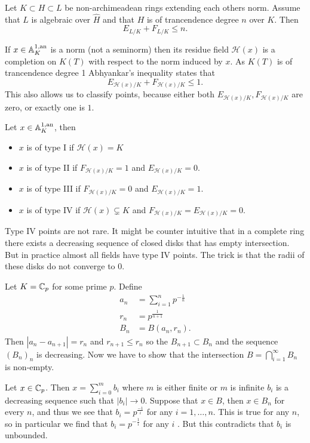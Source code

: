 \begin{theorem}
	Let $K \subset H \subset L$ be non-archimeadean rings extending each others norm. Assume that $L$ is algebraic over $\hat{H}$ and that $H$ is of trancendence degree $n$ over $K$. Then \[
	E_{L / K} + F_{L / K}  \le n
	.\] 
\end{theorem}

If $x \in \mathbb{A}_K^{1, \text{an}}$ is a norm (not a seminorm) then its residue field $\mathcal{H} (x)$ is a completion on $K(T)$ with respect to the norm induced by $x$. As $K(T)$ is of trancendence degree 1 Abhyankar's inequality states that \[
	E_{\mathcal{H} (x) / K} + F_{\mathcal{H} (x) / K} \le 1
.\] 
This also allows us to classify points, because either both $E_{\mathcal{H} (x) / K}, F_{\mathcal{H} (x) / K}$ are zero, or exactly one is $1$. 
\begin{proposition}
	Let $x \in \mathbb{A}_K^{1, \text{an}}$, then 
	\begin{itemize}
		\item $x$ is of type I if $\mathcal{H} (x) = K$
		\item $x$ is of type II if $F_{\mathcal{H} (x) / K} = 1$ and $E_{\mathcal{H} (x) / K} = 0$. 
		\item $x$ is of type III if $F_{\mathcal{H} (x) / K} = 0$ and $E_{\mathcal{H} (x) / K} = 1$.
		\item $x$ is of type IV if $\mathcal{H} (x) \subsetneq K$ and  $F_{\mathcal{H} (x) / K} = E_{\mathcal{H} (x) / K} = 0$.
	\end{itemize}
\end{proposition}

Type IV points are not rare. It might be counter intuitive that in a complete ring there exists a decreasing sequence of closed disks that has empty intersection. 
But in practice almost all fields have type  IV points. 
The trick is that the radii of these disks do not converge to $0$. 
\begin{example}\label{ex:type4point}
	Let $K = \mathbb{C}_p$ for some prime $p$. 
	Define 
	\begin{align*}
		a_n &= \sum_{i = 1}^{n} p^{-\frac{1}{n}}\\
		r_n &= p^{\frac{1}{n + 1}} \\
		B_n &= B(a_n, r_n) 
.\end{align*}
Then $|a_n - a_{n + 1}| = r_n$ and $r_{n + 1} \le r_n$ so the $B_{n + 1} \subset B_n$ and the sequence $(B_n)_n$ is decreasing. 
Now we have to show that the intersection $B = \bigcap_{i = 1} ^{\infty} B_n$ is non-empty. 

Let $x \in \mathbb{C}_p$. Then $x = \sum_{i = 0}^{m} b_i$ where $m$ is either finite or $m$ is infinite $b_i$ is a decreasing sequence such that $|b_i| \to 0$. Suppose that  $x \in B$, then $x \in B_n$ for every $n$, and thus we see that  $b_i = p^{\frac{-1}{i}}$ for any $i = 1, \ldots, n$.  
This is true for any $n $, so in particular we find that $b_i = p^{-\frac{1}{i}}$ for any $i$ .
But this contradicts that $b_i$ is unbounded. 
\end{example}
